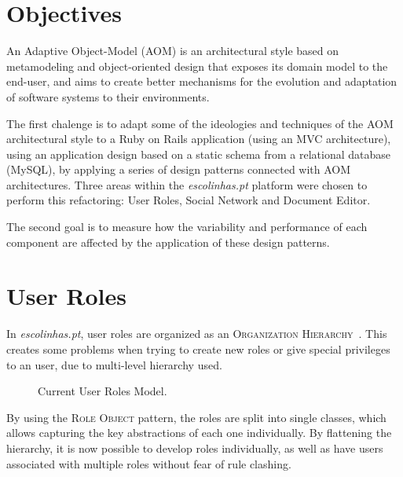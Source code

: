 \documentclass[9pt,a4paper]{extarticle}
\begin{document}
\begin{multicols}{2}
\section{Objectives}\label{sec:objectives}

An Adaptive Object-Model (AOM) is an architectural style based on metamodeling and object-oriented design that exposes its domain model to the end-user, and aims to create better mechanisms for the evolution and adaptation of software systems to their environments.

The first chalenge is to adapt some of the ideologies and techniques of the AOM architectural style to a Ruby on Rails application (using an MVC architecture), using an application design based on a static schema from a relational database (MySQL), by applying a series of design patterns connected with AOM architectures. Three areas within the \emph{escolinhas.pt} platform were chosen to perform this refactoring: User Roles, Social Network and Document Editor.

The second goal is to measure how the variability and performance of each component are affected by the application of these design patterns.

\section{User Roles}\label{sec:user_roles}

In \emph{escolinhas.pt}, user roles are organized as an \textsc{Organization Hierarchy}~\cite{fowler_accountability}. This creates some problems when trying to create new roles or give special privileges to an user, due to multi-level hierarchy used.

\begin{figure}[H]
  \caption{Current User Roles Model.}
  \label{fig:user_roles_current}
\end{figure}

By using the \textsc{Role Object} pattern, the roles are split into single classes, which allows capturing the key abstractions of each one individually. By flattening the hierarchy, it is now possible to develop roles individually, as well as have users associated with multiple roles without fear of rule clashing.


\end{multicols}
\end{document}
